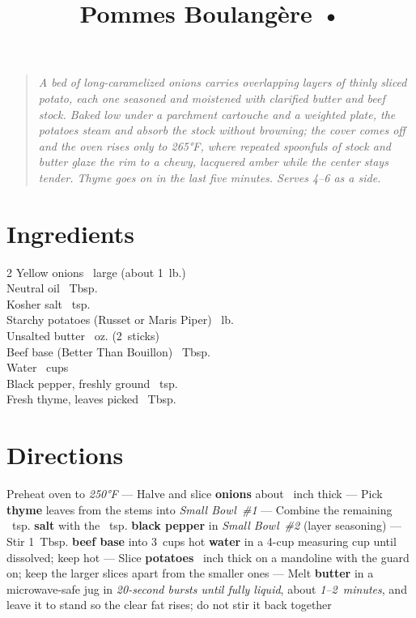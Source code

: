 \documentclass[11pt,letterpaper]{article}
\title{Pommes Boulang\`ere •}
\author{}
\date{}
\begin{document}
\maketitle
\thispagestyle{empty}

\begin{quote}\textit{A bed of long-caramelized onions carries overlapping layers of thinly sliced potato, each one seasoned and moistened with clarified butter and beef stock. Baked low under a parchment cartouche and a weighted plate, the potatoes steam and absorb the stock without browning; the cover comes off and the oven rises only to \textit{265°F}, where repeated spoonfuls of stock and butter glaze the rim to a chewy, lacquered amber while the center stays tender. Thyme goes on in the last five minutes. Serves 4--6 as a side.}\end{quote}

\section*{Ingredients}
\setlength{\columnsep}{20pt}
\begin{multicols}{2}
\noindent
    Yellow onions ~large (about 1~lb.) \\
    Neutral oil ~Tbsp. \\
    Kosher salt ~tsp. \\
    Starchy potatoes (Russet or Maris Piper) ~lb. \\
    Unsalted butter ~oz. (2~sticks) \\

    \columnbreak
    \noindent
    Beef base (Better Than Bouillon) ~Tbsp. \\
    Water ~cups \\
    Black pepper, freshly ground \dotfill {}~tsp. \\
    Fresh thyme, leaves picked ~Tbsp. \\
\end{multicols}

\section*{Directions}

\noindent
Preheat oven to \textit{250°F} ---
Halve and slice \textbf{onions} about ~inch thick ---
Pick \textbf{thyme} leaves from the stems into \textit{Small Bowl~\#1} ---
Combine the remaining ~tsp. \textbf{salt} with the ~tsp. \textbf{black pepper} in \textit{Small Bowl~\#2} (layer seasoning) ---
Stir 1~Tbsp. \textbf{beef base} into 3~cups hot \textbf{water} in a 4-cup measuring cup until dissolved; keep hot ---
Slice \textbf{potatoes} ~inch thick on a mandoline with the guard on; keep the larger slices apart from the smaller ones ---
Melt \textbf{butter} in a microwave-safe jug in \textit{20-second bursts until fully liquid}, about \textit{1--2~minutes}, and leave it to stand so the clear fat rises; do not stir it back together
\end{document}
